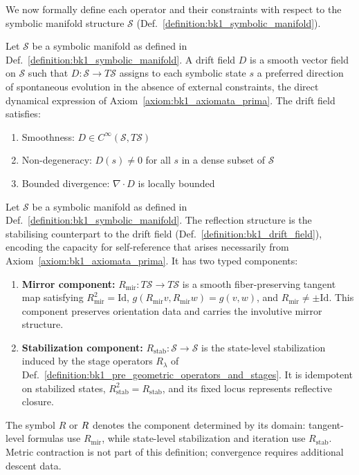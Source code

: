 We now formally define each operator and their constraints with respect to the symbolic manifold structure \( \mathcal{S} \) (Def.~\ref{definition:bk1_symbolic_manifold}).

\begin{definition}
\label{definition:bk1_drift_field}
Let $\mathcal{S}$ be a symbolic manifold as defined in Def.~\ref{definition:bk1_symbolic_manifold}.
A drift field $D$ is a smooth vector field on $\mathcal{S}$ such that \( D: \mathcal{S} \rightarrow T\mathcal{S} \) assigns to each symbolic state \( s \) a preferred direction of spontaneous evolution in the absence of external constraints, the direct dynamical expression of Axiom~\ref{axiom:bk1_axiomata_prima}. The drift field satisfies:
\begin{enumerate}
    \item Smoothness: \( D \in C^\infty(\mathcal{S}, T\mathcal{S}) \)
    \item Non-degeneracy: \( D(s) \neq 0 \) for all \( s \) in a dense subset of \( \mathcal{S} \)
    \item Bounded divergence: \( \nabla \cdot D \) is locally bounded
\end{enumerate}
\end{definition}

\begin{definition}
\label{definition:bk1_reflection_operator}
Let $\mathcal{S}$ be a symbolic manifold as defined in Def.~\ref{definition:bk1_symbolic_manifold}.
The reflection structure is the stabilising counterpart to the drift field
(Def.~\ref{definition:bk1_drift_field}), encoding the capacity for
self-reference that arises necessarily from Axiom~\ref{axiom:bk1_axiomata_prima}.
It has two typed components:
\begin{enumerate}
    \item \textbf{Mirror component:} \(R_{\mathrm{mir}}:T\mathcal{S}\rightarrow T\mathcal{S}\) is a smooth fiber-preserving tangent map satisfying \(R_{\mathrm{mir}}^2=\mathrm{Id}\), \(g(R_{\mathrm{mir}}v,R_{\mathrm{mir}}w)=g(v,w)\), and \(R_{\mathrm{mir}}\neq \pm\mathrm{Id}\). This component preserves orientation data and carries the involutive mirror structure.
    \item \textbf{Stabilization component:} \(R_{\mathrm{stab}}:\mathcal{S}\rightarrow\mathcal{S}\) is the state-level stabilization induced by the stage operators \(R_\lambda\) of Def.~\ref{definition:bk1_pre_geometric_operators_and_stages}. It is idempotent on stabilized states, \(R_{\mathrm{stab}}^2=R_{\mathrm{stab}}\), and its fixed locus represents reflective closure.
\end{enumerate}
The symbol \(R\) or \(R\) denotes the component determined by its domain:
tangent-level formulas use \(R_{\mathrm{mir}}\), while state-level stabilization
and iteration use \(R_{\mathrm{stab}}\). Metric contraction is not part of this
definition; convergence requires additional descent data.
\end{definition}


